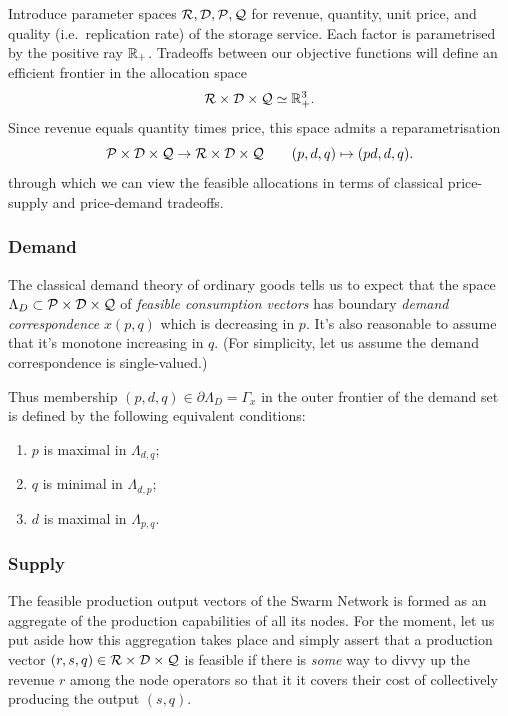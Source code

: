 Introduce parameter spaces $\mathcal{R},\mathcal{D},\mathcal{P},\mathcal{Q}$ for revenue, quantity, unit price, and quality (i.e.~replication rate) of the storage service.
%
Each factor is parametrised by the positive ray $\mathbb{R}_+$.
%
Tradeoffs between our objective functions will define an efficient frontier in the allocation space
%
\[
  \mathcal{R}\times\mathcal{D}\times\mathcal{Q} \simeq \mathbb{R}_+^3.
\]
%
Since revenue equals quantity times price, this space admits a reparametrisation
%
\[ 
  \mathcal{P} \times\mathcal{D} \times \mathcal{Q} \rightarrow \mathcal{R} \times\mathcal{D}\times \mathcal{Q} \qquad
  (p,d,q) \mapsto (pd, d, q).
\]
%
through which we can view the feasible allocations in terms of classical price-supply and price-demand tradeoffs.

\subsubsection{Demand}
\label{section:demand}
%
The classical demand theory of ordinary goods tells us to expect that the space $\Lambda_D\subset\mathcal{P}\times\mathcal{D}\times\mathcal{Q}$ of \emph{feasible consumption vectors} has boundary \emph{demand correspondence} $x(p,q)$ which is decreasing in $p$.
%
It's also reasonable to assume that it's monotone increasing in $q$.
%
(For simplicity, let us assume the demand correspondence is single-valued.)

Thus membership $(p,d,q)\in \partial\Lambda_D = \Gamma_x$ in the outer frontier of the demand set is defined by the following equivalent conditions:
%
\begin{enumerate}
  \item $p$ is maximal in $\Lambda_{d,q}$;
  \item $q$ is minimal in $\Lambda_{d,p}$;
  \item $d$ is maximal in $\Lambda_{p,q}$.
\end{enumerate}

\subsubsection{Supply}
\label{section:supply}
%
The feasible production output vectors of the Swarm Network is formed as an aggregate of the production capabilities of all its nodes.
%
For the moment, let us put aside how this aggregation takes place and simply assert that a production vector $(r,s,q)\in \mathcal{R}\times\mathcal{D}\times\mathcal{Q}$ is feasible if there is \emph{some} way to divvy up the revenue $r$ among the node operators so that it it covers their cost of collectively producing the output $(s,q)$.

